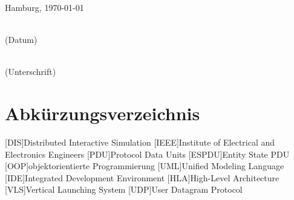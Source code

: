 \vspace{1cm}
Hamburg, \today\\[-1ex]
\mbox{}\hspace{2.2cm}\parbox[t]{4cm}{\centering \dotfill\\(Datum)}\hspace{0.5cm}
					\parbox[t]{8cm}{\centering \dotfill\\(Unterschrift)}
					
\cleardoublepage
\listoftables
\lstlistoflistings
{}

\newpage
\chapter*{Abkürzungsverzeichnis}
%
\begin{acronym}[XXXXXX]
	\setlength{\itemsep}{-\parsep}
	[DIS]{Distributed Interactive Simulation}
	[IEEE]{Institute of Electrical and Electronics Engineers}
	[PDU]{Protocol Data Units}
	[ESPDU]{Entity State PDU}
	[OOP]{objektorientierte Programmierung }
	[UML]{Unified Modeling Language}
	[IDE]{Integrated Development Environment}
	[HLA]{High-Level Architecture}
	[VLS]{Vertical Launching System }
	[UDP]{User Datagram Protocol}
	
\end{acronym}
\newpage

% 







\cleardoublepage
\tableofcontents


%

\newpage


